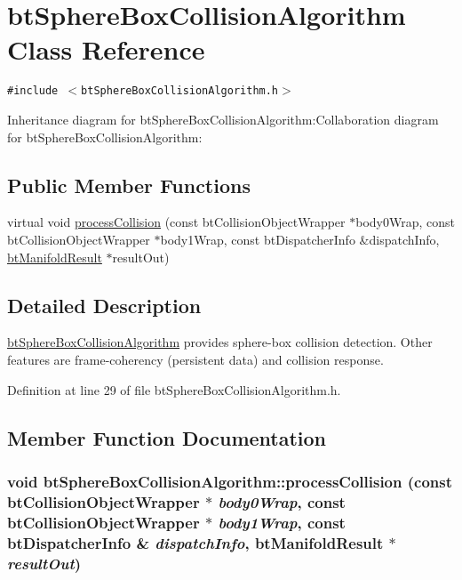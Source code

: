 \hypertarget{classbt_sphere_box_collision_algorithm}{
\section{btSphereBoxCollisionAlgorithm Class Reference}
\label{classbt_sphere_box_collision_algorithm}
}
{\tt \#include $<$btSphereBoxCollisionAlgorithm.h$>$}

Inheritance diagram for btSphereBoxCollisionAlgorithm:Collaboration diagram for btSphereBoxCollisionAlgorithm:\subsection*{Public Member Functions}
\begin{CompactItemize}
\item 
virtual void \hyperlink{classbt_sphere_box_collision_algorithm_b171b2afeabaaaa8a51728426643c369}{processCollision} (const btCollisionObjectWrapper $\ast$body0Wrap, const btCollisionObjectWrapper $\ast$body1Wrap, const btDispatcherInfo \&dispatchInfo, \hyperlink{classbt_manifold_result}{btManifoldResult} $\ast$resultOut)
\end{CompactItemize}


\subsection{Detailed Description}
\hyperlink{classbt_sphere_box_collision_algorithm}{btSphereBoxCollisionAlgorithm} provides sphere-box collision detection. Other features are frame-coherency (persistent data) and collision response. 

Definition at line 29 of file btSphereBoxCollisionAlgorithm.h.

\subsection{Member Function Documentation}
\hypertarget{classbt_sphere_box_collision_algorithm_b171b2afeabaaaa8a51728426643c369}{
\subsubsection[processCollision]{\setlength{\rightskip}{0pt plus 5cm}void btSphereBoxCollisionAlgorithm::processCollision (const btCollisionObjectWrapper $\ast$ {\em body0Wrap}, \/  const btCollisionObjectWrapper $\ast$ {\em body1Wrap}, \/  const btDispatcherInfo \& {\em dispatchInfo}, \/  {\bf btManifoldResult} $\ast$ {\em resultOut})}}
\label{classbt_sphere_box_collision_algorithm_b171b2afeabaaaa8a51728426643c369}




